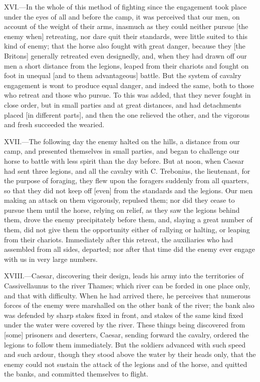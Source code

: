 XVI.—In the whole of this method of fighting since the engagement took
place under the eyes of all and before the camp, it was perceived that
our men, on account of the weight of their arms, inasmuch as they could
neither pursue [the enemy when] retreating, nor dare quit their
standards, were little suited to this kind of enemy; that the horse also
fought with great danger, because they [the Britons] generally retreated
even designedly, and, when they had drawn off our men a short distance
from the legions, leaped from their chariots and fought on foot in
unequal [and to them advantageous] battle. But the system of cavalry
engagement is wont to produce equal danger, and indeed the same, both to
those who retreat and those who pursue. To this was added, that they
never fought in close order, but in small parties and at great
distances, and had detachments placed [in different parts], and then the
one relieved the other, and the vigorous and fresh succeeded the
wearied.

XVII.—The following day the enemy halted on the hills, a distance from
our camp, and presented themselves in small parties, and began to
challenge our horse to battle with less spirit than the day before. But
at noon, when Caesar had sent three legions, and all the cavalry with C.
Trebonius, the lieutenant, for the purpose of foraging, they flew upon
the foragers suddenly from all quarters, so that they did not keep off
[even] from the standards and the legions. Our men making an attack on
them vigorously, repulsed them; nor did they cease to pursue them until
the horse, relying on relief, as they saw the legions behind them, drove
the enemy precipitately before them, and, slaying a great number of
them, did not give them the opportunity either of rallying or halting,
or leaping from their chariots. Immediately after this retreat, the
auxiliaries who had assembled from all sides, departed; nor after that
time did the enemy ever engage with us in very large numbers.

XVIII.—Caesar, discovering their design, leads his army into the
territories of Cassivellaunus to the river Thames; which river can be
forded in one place only, and that with difficulty. When he had arrived
there, he perceives that numerous forces of the enemy were marshalled on
the other bank of the river; the bank also was defended by sharp stakes
fixed in front, and stakes of the same kind fixed under the water were
covered by the river. These things being discovered from [some]
prisoners and deserters, Caesar, sending forward the cavalry, ordered
the legions to follow them immediately. But the soldiers advanced with
such speed and such ardour, though they stood above the water by their
heads only, that the enemy could not sustain the attack of the legions
and of the horse, and quitted the banks, and committed themselves to
flight.

